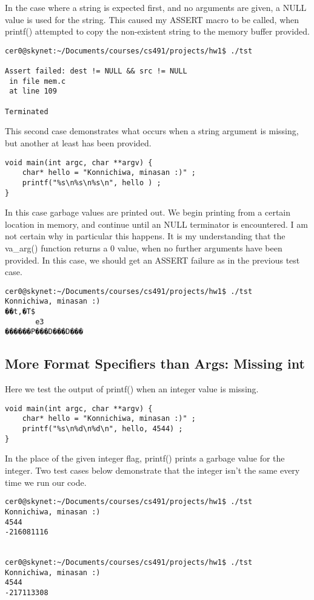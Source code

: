 \documentclass[onecolumn]{article}
\begin{document}
In the case where a string is expected first, and no arguments are 
given, a NULL value is used for the string. This caused my 
ASSERT macro to be called, when printf() attempted to copy
the non-existent string to the memory buffer provided.
\begin{verbatim}
cer0@skynet:~/Documents/courses/cs491/projects/hw1$ ./tst

Assert failed: dest != NULL && src != NULL
 in file mem.c
 at line 109

Terminated
\end{verbatim}
This second case demonstrates what occurs when a string 
argument is missing, but another at least has been provided.
\begin{verbatim}
void main(int argc, char **argv) {
	char* hello = "Konnichiwa, minasan :)" ;
	printf("%s\n%s\n%s\n", hello ) ;
}
\end{verbatim}
In this case garbage values are printed out. 
We begin printing from a certain location in memory,
and continue until an NULL terminator is encountered. I am not certain
why in particular this happens. It is my understanding that
the va\_arg() function returns a 0 value, when no further 
arguments have been provided. In this case, we should get
an ASSERT failure as in the previous test case.

\begin{verbatim}
cer0@skynet:~/Documents/courses/cs491/projects/hw1$ ./tst
Konnichiwa, minasan :)
��t,�T$
       e3
������P���D���D���

\end{verbatim}
\subsection{More Format Specifiers than Args: Missing int }
Here we test the output of printf() when an integer value is 
missing. 
\begin{verbatim}
void main(int argc, char **argv) {
	char* hello = "Konnichiwa, minasan :)" ;
	printf("%s\n%d\n%d\n", hello, 4544) ;
}
\end{verbatim}

In the place of the given integer flag, printf() prints
a garbage value for the integer. Two test cases below
demonstrate that the integer isn't the same every time
we run our code.
\begin{verbatim}
cer0@skynet:~/Documents/courses/cs491/projects/hw1$ ./tst
Konnichiwa, minasan :)
4544
-216081116


cer0@skynet:~/Documents/courses/cs491/projects/hw1$ ./tst
Konnichiwa, minasan :)
4544
-217113308
\end{verbatim}
\end{document}
